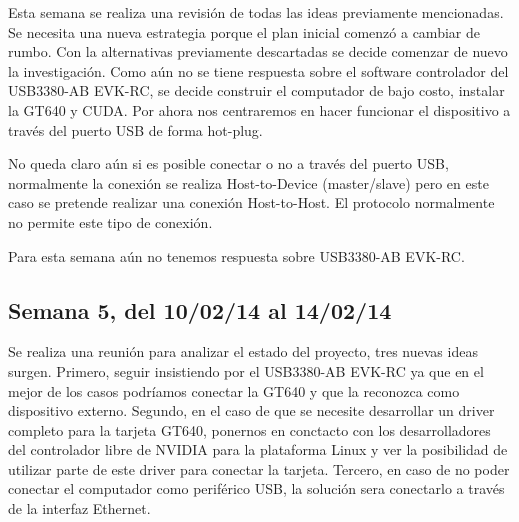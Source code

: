 \documentclass[11pt,oneside,titlepage]{article}
\begin{document}
Esta semana se realiza una revisión de todas las ideas previamente mencionadas. Se necesita una nueva estrategia porque el plan inicial comenzó a cambiar de rumbo. Con la alternativas previamente descartadas se decide comenzar de nuevo la investigación. Como aún no se tiene respuesta sobre el software controlador del USB3380-AB EVK-RC, se decide construir el computador de bajo costo, instalar la GT640 y CUDA. Por ahora nos centraremos en hacer funcionar el dispositivo a través del puerto USB de forma hot-plug. 

No queda claro aún si es posible conectar o no a través del puerto USB, normalmente la conexión se realiza Host-to-Device (master/slave) pero en este caso se pretende realizar una conexión Host-to-Host. El protocolo normalmente no permite este tipo de conexión.

Para esta semana aún no tenemos respuesta sobre USB3380-AB EVK-RC.

\subsection*{Semana 5, del 10/02/14 al 14/02/14}
\begin{comment}
lunes
- Ademas se realizó un estudio sobre como conectar el comptuador de una forma
plug and play, las opciones son utilizar el puerto Ethernet o, mejor aún,
realizar la conexión a trav\'es USB.

martes 
- Reunion con el profesor para ver el estado del proyecto. 3 ideas
  nuevas aparecieron.

miercoles 
- Contacto con un desarrollador de USB3380 para solicitar ayuda en el
  campo. 
- Estudio de RNDIS para conectar usb a usb, existe la posibilidad.

jueves 
- Estudio del funcionamiento de usb. Aprendi que podemos utilizar el
  computador como gadget y realizar la configuración recompilando el kernel y
  agregando los drivers.Mas detalles leer Linux Gadget Drivers
- Aún falta el cable. 
- Compilación del kernel para agregar los módulos. Estamos a la espera
  del cable USB macho macho.

viernes 
- Update del proyecto al profesor Claudio torres. 
 - compramos cable USB 3.0, estamos a la espera del envío.
\end{comment}

Se realiza una reunión para analizar el estado del proyecto, tres nuevas ideas surgen. Primero, seguir insistiendo por el  USB3380-AB EVK-RC ya que en el mejor de los casos podríamos conectar la GT640 y que la reconozca como dispositivo externo. Segundo, en el caso de que se necesite desarrollar un driver completo para la tarjeta GT640, ponernos en conctacto con los desarrolladores del controlador libre de NVIDIA para la plataforma Linux y ver la posibilidad de utilizar parte de este driver para conectar la tarjeta. Tercero, en caso de no poder conectar el computador como periférico USB, la solución sera conectarlo a través de la interfaz Ethernet.
\end{document}
